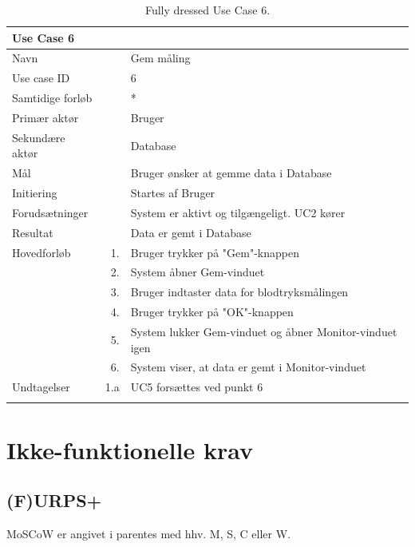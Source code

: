 \begin{longtabu} to  %
    {\large \textbf{Use Case 6}} && \\
    \toprule
    Navn &&    Gem måling\\
    Use case ID &&    6\\
    Samtidige forløb &&   *\\
    Primær aktør &&    Bruger\\
    Sekundære aktør &&	Database\\
    Mål &&    Bruger ønsker at gemme data i Database\\
    Initiering &&	Startes af Bruger\\
    Forudsætninger &&  System er aktivt og tilgængeligt. UC2 kører  \\
    Resultat &&		Data er gemt i Database                 \\ \midrule
    Hovedforløb &    1. &    Bruger trykker på "Gem"\--knappen \\	
                &    2. &    System åbner Gem-vinduet\\[-1ex]
                &    3.	&	 Bruger indtaster data for blodtryksmålingen \\[-1ex]
                &	 4. &    Bruger trykker på "OK"\--knappen  \\[-1ex]
                &	 5.	&	 System lukker Gem-vinduet og åbner Monitor-vinduet igen\\[-1ex]
                &	 6.	&	 System viser, at data er gemt i Monitor-vinduet\newline
                
                \\ \midrule
                
    Undtagelser &   1.a  &  UC5 forsættes ved punkt 6    \\ \bottomrule
\caption{Fully dressed Use Case 6.}
\label{UC6}
\end{longtabu}


\section{Ikke-funktionelle krav}


\subsection{(F)URPS+}
MoSCoW er angivet i parentes med hhv. M, S, C eller W.

